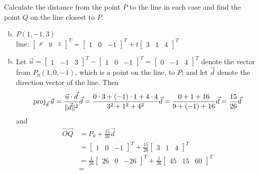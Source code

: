 \documentclass[../main.tex]{subfiles}
\begin{document}
Calculate the distance from the point $P$ to the line in each case and find the point $Q$ on the line closest to $P$.
\begin{enumerate}[a)]
	\setcounter{enumi}{1}
	\item $P(1, -1, 3)$ \\
		line:
		\(
			\begin{bmatrix}x&y&z\end{bmatrix}^T
			=
			\begin{bmatrix}1&0&-1\end{bmatrix}^T
			+
			t\begin{bmatrix}3&1&4\end{bmatrix}^T
		\)
\end{enumerate}

\solution
\begin{enumerate}[a)]
	\setcounter{enumi}{1}
	\item 
		Let
		\(
			\vec{u}
			=
			\begin{bmatrix}
				1 &
				-1 &
				3
			\end{bmatrix}^T
			-
			\begin{bmatrix}
				1 &
				0 &
				-1
			\end{bmatrix}^T
			=
			\begin{bmatrix}
				0 &
				-1 &
				4
			\end{bmatrix}^T
		\)
		denote the vector from $P_0(1, 0, -1)$, which is a point on the line, to $P$; and let $\vec{d}$ denote the direction vector of the line.
		Then
		\[
			\operatorname{proj}_{\vec{d}}\vec{u}
			=
			\frac{\vec{u}\cdot\vec{d}}{\|\vec{d}\|^2}
			\vec{d}
			=
			\frac{0\cdot3 + (-1)\cdot1 + 4\cdot4}{3^2 + 1^2 + 4^2}
			\vec{d}
			=
			\frac{0 + 1 + 16}{9 + (-1) + 16}
			\vec{d}
			=
			\frac{15}{26}
			\vec{d}
		\]
		and
		\begin{align*}
			\overrightarrow{OQ}
			&=
			P_0
			+
			\frac{15}{26}\vec{d}
			\\&=
			\begin{bmatrix}1&0&-1\end{bmatrix}^T
			+
			\frac{15}{26}\begin{bmatrix}3&1&4\end{bmatrix}^T
			\\&=
			\frac{1}{26}\begin{bmatrix}26&0&-26\end{bmatrix}^T
			+
			\frac{1}{26}\begin{bmatrix}45&15&60\end{bmatrix}^T
			\\&=

\end{align*}
\end{enumerate}
\end{document}
